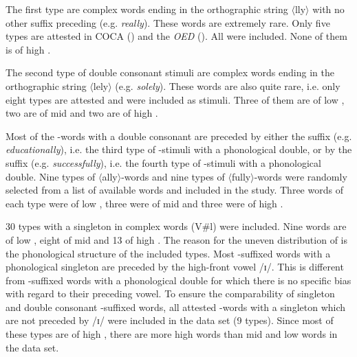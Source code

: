The first type are complex words ending in the orthographic string $\langle$lly$\rangle$ with no other suffix preceding  (e.g. \textit{really}). These words are extremely rare. Only five types are attested  in  {COCA} (\citealt{Davies.20082014}) and the \textit{OED} (\citealt{OED.2013}). All were included. None of them is of high .

The second type of double consonant stimuli are complex words ending in the orthographic string $\langle$lely$\rangle$ (e.g. \textit{solely}). These words are also quite rare, i.e. only eight  types are attested and were included as stimuli. Three of them  are of low , two are of mid  and two are of high .



Most of the -words with a double consonant are preceded by either the suffix  (e.g. \textit{educationally}), i.e. the third type of -stimuli with a phonological double, or by the suffix  (e.g. \textit{successfully}), i.e. the fourth type of -stimuli with a phonological double. Nine types of $\langle$ally$\rangle$-words and nine types of $\langle$fully$\rangle$-words were randomly selected from a list of available words and included in the study. Three words of each type were of low , three were of mid  and three were of high .



30 types with a singleton in complex words (V\#l) were included. Nine words are of low , eight of mid  and 13 of high . The reason for the uneven distribution of  is the phonological structure of the included types. Most -suffixed words with a phonological singleton are preceded by the high-front vowel /ɪ/. This is different from -suffixed words with a phonological double for which there is no specific bias with regard to their preceding vowel. To ensure the comparability of singleton and double consonant -suffixed words, all attested -words with a singleton which are not preceded by /ɪ/ were included in the data set (9 types). Since most of these types are of high , there are more high  words than mid and low  words in the data set. %






